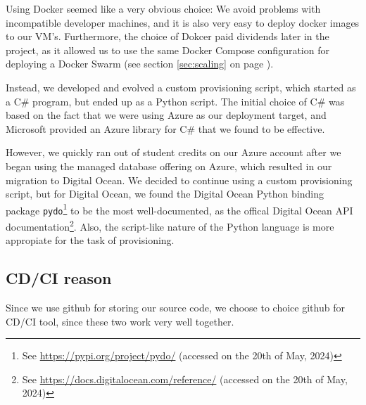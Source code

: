 Using Docker seemed like a very obvious choice: We avoid problems with incompatible developer machines, and it is also very easy to deploy docker images to our VM's. Furthermore, the choice of Dokcer paid dividends later in the project, as it allowed us to use the same Docker Compose configuration for deploying a Docker Swarm (see section \ref{sec:scaling} on page \pageref{sec:scaling}).

Instead, we developed and evolved a custom provisioning script, which started as a C\# program, but ended up as a Python script.
The initial choice of C\# was based on the fact that we were using Azure as our deployment target, and Microsoft provided an Azure library for C\# that we found to be effective.

However, we quickly ran out of student credits on our Azure account after we began using the managed database offering on Azure, which resulted in our migration to Digital Ocean.
We decided to continue using a custom provisioning script, but for Digital Ocean, we found the Digital Ocean Python binding package \texttt{pydo}\footnote{See \url{https://pypi.org/project/pydo/} (accessed on the 20th of May, 2024)} to be the most well-documented, as the offical Digital Ocean API documentation\footnote{See \url{https://docs.digitalocean.com/reference/} (accessed on the 20th of May, 2024)}.
Also, the script-like nature of the Python language is more appropiate for the task of provisioning.


\subsection{CD/CI reason}
Since we use github for storing our source code, we choose to choice github for CD/CI tool, since these two work very well together.


